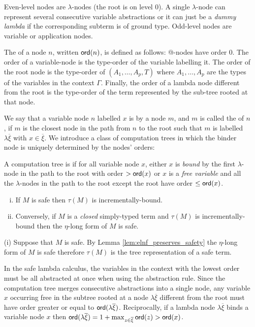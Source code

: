 Even-level nodes are $\lambda$-nodes (the root is on level 0). A
single $\lambda$-node can represent several consecutive variable
abstractions or it can just be a \emph{dummy lambda} if the
corresponding subterm is of ground type.  Odd-level nodes are variable or application nodes.

The  of a node $n$, written ${\sf ord}(n)$, is defined as follows:
@-nodes have order $0$. The order of a variable-node is the type-order of the variable labelling it.
The order of the root node is the type-order of $(A_1,\ldots,A_p, T)$ where $A_1,\ldots, A_p$ are the types of the variables in the context $\Gamma$.
Finally, the order of a lambda node different from the root is the type-order of the term represented by the sub-tree rooted at that node.

We say that a variable node $n$ labelled $x$ is  by a node $m$, and $m$ is called the  of $n$, if $m$ is the closest node in the path from $n$ to the root such that $m$ is labelled
$\lambda \overline{\xi}$ with $x\in \overline{\xi}$.
We introduce a class of computation trees in which the binder
node is uniquely determined by the nodes' orders:
\begin{definition}\rm
  A computation tree is  if for all
  variable node $x$, either $x$ is \emph{bound} by the first
  $\lambda$-node in the path to the root with order $> {\sf ord}(x)$ or $x$
  is a \emph{free variable} and all the $\lambda$-nodes in the path to
  the root except the root have order $\leq {\sf ord}(x)$.
\end{definition}

\begin{proposition} \hfill
\label{prop:safe_imp_incrbound}
\begin{enumerate}[(i)]
\item If $M$ is safe then $\tau(M)$ is incrementally-bound.
\item Conversely, if $M$ is a \emph{closed} simply-typed term and $\tau(M)$
is incrementally-bound then the $\eta$-long form of $M$ is safe.
\end{enumerate}
\end{proposition}
\proof
  (i) Suppose that $M$ is safe. By Lemma
  \ref{lem:elnf_preserves_safety} the $\eta$-long form of $M$ is safe
  therefore $\tau(M)$ is the tree representation of a safe term.

In the safe lambda calculus, the variables in the context with the
lowest order must be all abstracted at once when using the abstraction
rule. Since the computation tree merges consecutive abstractions into
a single node, any variable $x$ occurring free in the subtree rooted
at a node $\lambda \overline{\xi}$ different from the root must have
order greater or equal to ${\sf ord}(\lambda
  \overline{\xi})$. Reciprocally, if a lambda node $\lambda
\overline{\xi}$ binds a variable node $x$ then ${\sf ord}(\lambda
  \overline{\xi}) = 1+\max_{z\in\overline{\xi}} {\sf ord}(z) > {\sf ord}(x)$.

